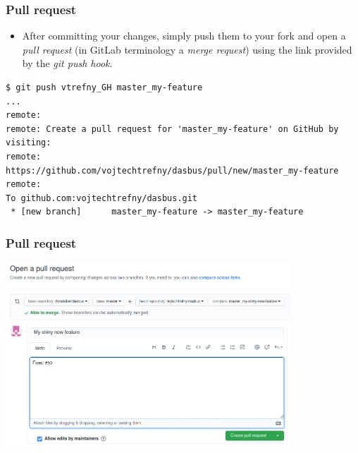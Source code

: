 \documentclass[aspectratio=169]{beamer}              %
\begin{document}
\begin{frame}[fragile]
	\frametitle{Pull request}
	
	\begin{block}{}
		\begin{itemize}
			\item After committing your changes, simply push them to your fork and open a \emph{pull request} (in GitLab terminology a \emph{merge request}) using the link provided by the \emph{git push hook}.
		\end{itemize}
	\end{block}
	
	\begin{lstlisting}[frame=none, basicstyle=\ttfamily\small, columns=fullflexible, keepspaces=true]
$ git push vtrefny_GH master_my-feature
...
remote: 
remote: Create a pull request for 'master_my-feature' on GitHub by visiting:
remote:      https://github.com/vojtechtrefny/dasbus/pull/new/master_my-feature
remote: 
To github.com:vojtechtrefny/dasbus.git
 * [new branch]      master_my-feature -> master_my-feature
\end{lstlisting}

\end{frame}

\begin{frame}[fragile]
	\frametitle{Pull request}
	
	\begin{center}
  	  \includegraphics[width=0.8\textwidth]{img/gh-open-pr.png}
	\end{center}
\end{frame}
\end{document}
